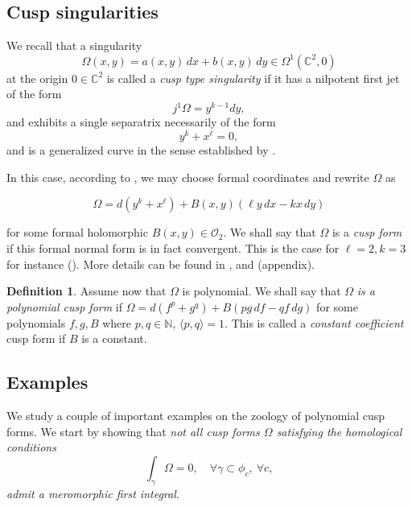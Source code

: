 \documentclass[11pt,a4paper]{amsart}
\theoremstyle{definition}
\newtheorem{definition}[theorem]{Definition}
\begin{document}
\subsection{Cusp singularities}

We recall that a singularity
\[
\Omega(x,y)=a(x,y)\,dx + b(x,y)\,dy
\in \Omega^1(\mathbb{C}^2,0)
\]
at the origin $0\in\mathbb{C}^2$
is called a {\it cusp type singularity}
if it has a nilpotent first jet of the form
\[
j^1\Omega = y^{k-1}dy,
\]
and exhibits a single separatrix
necessarily of the form
\[
y^k + x^\ell = 0,
\]
and is a generalized curve in the sense
established by \cite{[C-LN-S]}.

In this case, according to \cite{Takens},  we may choose formal coordinates and rewrite $\Omega$ as

\[
\Omega
=
d(y^k + x^\ell)
+
B(x,y)(\ell y\,dx - kx\,dy)
\]

for some formal holomorphic $B(x,y)\in\mathcal{O}_2$. We shall say that $\Omega$ is a 
{\it cusp form} if this formal normal form is in fact convergent. This is the case for 
$\ell=2, k=3$ for instance (\cite{Cerveau-Moussu}). More details can be found in \cite{Takens},\cite{Cerveau-Moussu} and \cite{CerveauLoray1998} (appendix). 


\begin{definition}
\label{definition:polynomialcuspform}
Assume now that $\Omega$ is polynomial.
We shall say that $\Omega$ {\it is a polynomial
cusp form} if
$
\Omega
=
d(f^p + g^q)
+
B(p g\,df - q f\,dg)
$ for some polynomials $f,g,B$ where
$p,q\in\mathbb{N}$,
$\langle p,q\rangle=1$. This is called a {\it constant coefficient } cusp form if $B$ is a constant.
\end{definition}


\subsection{Examples}
We study a couple of important examples on the zoology of polynomial cusp forms.
We start by showing that  {\em not all cusp forms $\Omega$
satisfying the homological conditions
\[
\int_{\gamma}\Omega=0,
\quad \forall\gamma\subset\phi_c,\ \forall c,
\]
admit a meromorphic first integral.}
\end{document}
